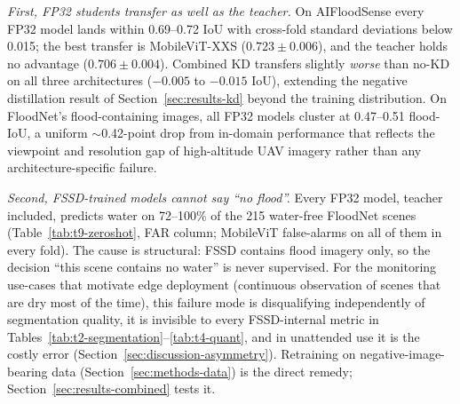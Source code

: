 

\emph{First, FP32 students transfer as well as the teacher.} On AIFloodSense every FP32 model lands within 0.69--0.72 IoU with cross-fold standard deviations below 0.015; the best transfer is MobileViT-XXS ($0.723 \pm 0.006$), and the teacher holds no advantage ($0.706 \pm 0.004$). Combined KD transfers slightly \emph{worse} than no-KD on all three architectures ($-0.005$ to $-0.015$ IoU), extending the negative distillation result of Section~\ref{sec:results-kd} beyond the training distribution. On FloodNet's flood-containing images, all FP32 models cluster at 0.47--0.51 flood-IoU, a uniform $\sim$0.42-point drop from in-domain performance that reflects the viewpoint and resolution gap of high-altitude UAV imagery rather than any architecture-specific failure.

\emph{Second, FSSD-trained models cannot say ``no flood''.} Every FP32 model, teacher included, predicts water on 72--100\% of the 215 water-free FloodNet scenes (Table~\ref{tab:t9-zeroshot}, FAR column; MobileViT false-alarms on all of them in every fold). The cause is structural: FSSD contains flood imagery only, so the decision ``this scene contains no water'' is never supervised. For the monitoring use-cases that motivate edge deployment (continuous observation of scenes that are dry most of the time), this failure mode is disqualifying independently of segmentation quality, it is invisible to every FSSD-internal metric in Tables~\ref{tab:t2-segmentation}--\ref{tab:t4-quant}, and in unattended use it is the costly error (Section~\ref{sec:discussion-asymmetry}). Retraining on negative-image-bearing data (Section~\ref{sec:methods-data}) is the direct remedy; Section~\ref{sec:results-combined} tests it.

